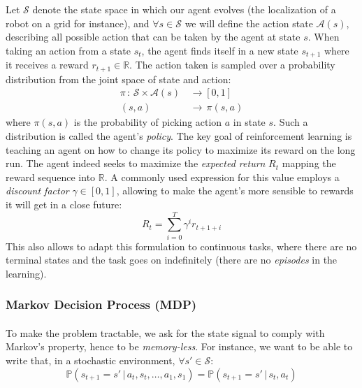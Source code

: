 {{{{				Let $\mathcal{S}$ denote the state space in which our agent evolves (the localization of a robot on a grid for instance), and $\forall{s}\in\mathcal{S}$ we will define the action state $\mathcal{A}(s)$, describing all possible action that can be taken by the agent at state $s$. When taking an action from a state $s_t$, the agent finds itself in a new state $s_{t+1}$ where it receives a reward $r_{t+1}\in\mathbb{R}$. The action taken is sampled over a probability distribution from the joint space of state and action: 
				\begin{equation}
					\begin{aligned}
						\pi \,  : \, \mathcal{S}\times\mathcal{A}(s) \, &\to [0,1]\\
							 (s,a) \, &\to \,  \pi(s,a)
					\end{aligned}
				\end{equation}	
				where $\pi(s,a)$ is the probability of picking action $a$ in state $s$. Such a distribution is called the agent's \emph{policy}. The key goal of reinforcement learning is teaching an agent on how to change its policy to maximize its reward on the long run. 
				The agent indeed seeks to maximize the \emph{expected return} $R_t$ mapping the reward sequence into $\mathbb{R}$. A commonly used expression for this value employs a \emph{discount factor} $\gamma \in [0,1]$, allowing to make the agent's more sensible to rewards it will get in a close future: 
				\begin{equation}
					R_t = \sum_{i=0}^T \gamma^i r_{t+1+i}
				\end{equation}
				This also allows to adapt this formulation to continuous tasks, where there are no terminal states and the task goes on indefinitely (there are no \emph{episodes} in the learning). 
			}
			\subsubsection{Markov Decision Process (MDP)}
			{
				\paragraph{} To make the problem tractable, we ask for the state signal to comply with Markov's property, hence to be \emph{memory-less}. For instance, we want to be able to write that, in a stochastic environment, $\forall s'\in\mathcal{S}$: 
				\begin{equation}
					\mathbb{P}\left( s_{t+1}=s' \, \vert \, a_t, s_t, \hdots, a_1,s_1\right) = \mathbb{P}\left( s_{t+1}=s' \, \vert \, s_t, a_t\right)
				\end{equation}
				
}}}}
